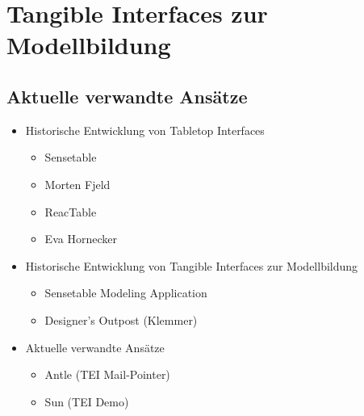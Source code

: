 \section{Tangible Interfaces zur Modellbildung} %
\label{sub:tangible_interfaces_zur_modellbildung}


\subsection{Aktuelle verwandte Ansätze} %
\label{sub:aktuelle_verwandte_ansätze}

\begin{itemize}
	\item Historische Entwicklung von Tabletop Interfaces
	\begin{itemize}
		\item Sensetable
		\item Morten Fjeld
		\item ReacTable
		\item Eva Hornecker
	\end{itemize}
	\item Historische Entwicklung von Tangible Interfaces zur Modellbildung
	\begin{itemize}
		\item Sensetable Modeling Application
		\item Designer's Outpost (Klemmer)
	\end{itemize}
	\item Aktuelle verwandte Ansätze
	\begin{itemize}
		\item Antle (TEI Mail-Pointer)
		\item Sun (TEI Demo)
	\end{itemize}
\end{itemize}



